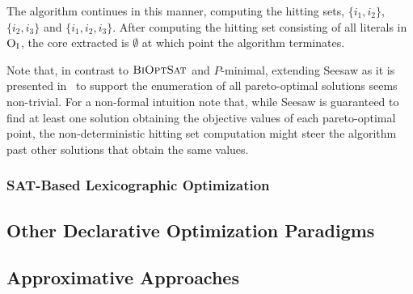 \begin{example}
The algorithm continues in this manner, computing the hitting sets, $\{i_1, i_2\}$, $\{i_2, i_3\}$ and $\{i_1, i_2, i_3\}$. 
After computing the hitting set consisting of all literals in $\textsc{O}_{\text{I}}$, the core extracted is $\emptyset$ at which point the algorithm terminates. 
\end{example}

Note that, in contrast to $\textsc{BiOptSat}$ and $P$-minimal, extending Seesaw as it is presented in~\textcite{DBLP:conf/cp/JanotaMSM21} to support the enumeration of all pareto-optimal solutions seems non-trivial. For a non-formal intuition note that, while Seesaw is guaranteed to find at least one solution obtaining the objective values of each pareto-optimal point, the non-deterministic 
hitting set computation might steer the algorithm past other solutions that obtain the same values.

\subsubsection{SAT-Based Lexicographic Optimization\label{sec:lex-opt}}

\subsection{Other Declarative Optimization Paradigms\label{sec:other-approaches}}

\subsection{Approximative Approaches\label{sec:approximative}}
